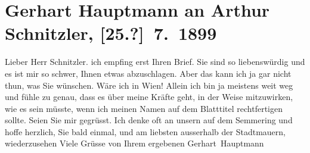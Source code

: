 

               \section[Gerhart Hauptmann an Arthur Schnitzler, {[}25.?{]} 7. 1899]{ Gerhart Hauptmann an Arthur Schnitzler, {[}25.?{]} 7. 1899}\nopagebreak{}\rehead{ }\begin{ledgroupsized}[t]{13cm}\normalsize\beginnumbering{} \toendnotes[C]{\smallbreak\pagebreak[2]} 
\toendnotes[C]{\smallbreak}\pstart{}{\pb}Lieber Herr Schnitzler.\pend\pstart
           ich empfing erst \label{K_L00950_1v}\label{K_L00950_1h}
               Ihren Brief. Sie sind so liebenswürdig und es ist mir so schwer, Ihnen etwas
               abzuschlagen. Aber das kann ich ja gar nicht thun, was Sie wünschen. Wäre ich in Wien! Allein ich bin ja meistens weit weg und fühle zu
               genau, dass es über meine Kräfte geht, in der Weise mitzuwirken, wie es sein müsste,
               wenn ich meinen Namen auf dem Blatttitel rechtfertigen sollte.\pend
           \pstart
           Seien Sie mir gegrüsst. Ich denke oft an unsern \label{K_L00950_2v}\label{K_L00950_2h} auf dem Semmering und hoffe herzlich, Sie
               bald einmal, und am liebsten ausserhalb der Stadtmauern, wiederzusehen\pend
           \pstart Viele Grüsse von Ihrem ergebenen \spacefill\mbox{Gerhart Hauptmann}\pend{}          \endnumbering{}\end{ledgroupsized}  \newcommand{\dateiname}{L00950}\newcommand{\titel}{Gerhart Hauptmann an Arthur Schnitzler, [25.?] 7. 1899}\newcommand{\editorInnen}{Martin Anton Müller und Gerd-Hermann Susen}
            \footnotesize
\begin{ledgroupsized}[t]{11.5cm}
\end{ledgroupsized}
         
      